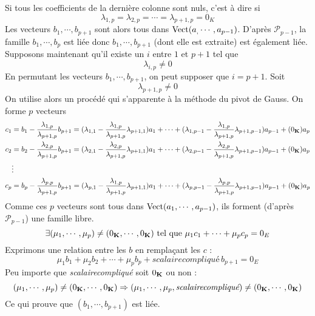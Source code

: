 \begin{demo}
\begin{itemize}
Si tous les coefficients de la dernière colonne sont nuls, c'est à dire si
\begin{displaymath}
 \lambda_{1,p}=\lambda_{2,p}=\cdots = \lambda_{p+1,p}=0_K
\end{displaymath}
Les vecteurs $b_1,\cdots ,b_{p+1}$ sont alors tous dans $\mathop{\mathrm{Vect}}(a_ ,\cdots,a_{p-1})$. D'après $\mathcal P_{p-1}$, la famille $b_1,\cdots ,b_{p}$ est liée donc $b_1,\cdots ,b_{p+1}$ (dont elle est extraite) est également liée.\newline
Supposons maintenant qu'il existe un $i$ entre $1$ et $p+1$ tel que 
\begin{displaymath}
 \lambda_{i,p}\neq 0
\end{displaymath}
En permutant les vecteurs $b_1,\cdots ,b_{p+1}$, on peut supposer que $i=p+1$. Soit
\begin{displaymath}
 \lambda_{p+1,p}\neq 0
\end{displaymath}
On utilise alors un procédé qui s'apparente à la méthode du pivot de Gauss. On forme $p$ vecteurs 
\begin{align*}
 c_1 &= b_1 - \dfrac{\lambda_{1,p}}{\lambda_{p+1,p}}b_{p+1} = 
(\lambda_{1,1}-\dfrac{\lambda_{1,p}}{\lambda_{p+1,p}}\lambda_{p+1,1})a_1 + \cdots +
(\lambda_{1,p-1}-\dfrac{\lambda_{1,p}}{\lambda_{p+1,p}}\lambda_{p+1,p-1})a_{p-1} + (0_{\mathbf{K}})a_p \\
 c_2 &= b_2 - \dfrac{\lambda_{2,p}}{\lambda_{p+1,p}}b_{p+1} = 
(\lambda_{2,1}-\dfrac{\lambda_{2,p}}{\lambda_{p+1,p}}\lambda_{p+1,1})a_1 + \cdots +
(\lambda_{2,p-1}-\dfrac{\lambda_{2,p}}{\lambda_{p+1,p}}\lambda_{p+1,p-1})a_{p-1} + (0_{\mathbf{K}})a_p \\
   &\vdots \\
 c_p &= b_p - \dfrac{\lambda_{p,p}}{\lambda_{p+1,p}}b_{p+1} = 
(\lambda_{p,1}-\dfrac{\lambda_{1,p}}{\lambda_{p+1,p}}\lambda_{p+1,1})a_1 + \cdots +
(\lambda_{p,p-1}-\dfrac{\lambda_{p,p}}{\lambda_{p+1,p}}\lambda_{p+1,p-1})a_{p-1} + (0_{\mathbf{K}})a_p 
\end{align*}
Comme ces $p$ vecteurs sont tous dans $\mathop{\mathrm{Vect}}(a_1,\cdots,a_{p-1})$, ils forment (d'après $\mathcal P_{p-1}$) une famille libre.
\begin{displaymath}
 \exists(\mu_1,\cdots,\mu_p)\neq(0_{\mathbf{K}},\cdots,0_{\mathbf{K}}) \text{ tel que } \mu_1c_1+\cdots+\mu_pc_p = 0_E
\end{displaymath}
Exprimons une relation entre les $b$ en remplaçant les $c$ :
\begin{displaymath}
 \mu_1 b_1 +\mu_2b_2 + \cdots +\mu_pb_p +\textit{scalairecompliqué}\,b_{p+1} = 0_E
\end{displaymath}
Peu importe que \textit{scalairecompliqué} soit $0_{\mathbf{K}}$ ou non :
\begin{displaymath}
 (\mu_1,\cdots,\mu_p)\neq(0_{\mathbf{K}},\cdots,0_{\mathbf{K}}) \Rightarrow (\mu_1,\cdots,\mu_p,\textit{scalairecompliqué})\neq(0_{\mathbf{K}},\cdots,0_{\mathbf{K}})
\end{displaymath}
Ce qui prouve que $(b_1,\cdots ,b_{p+1})$ est liée.
\end{itemize}
\end{demo}
